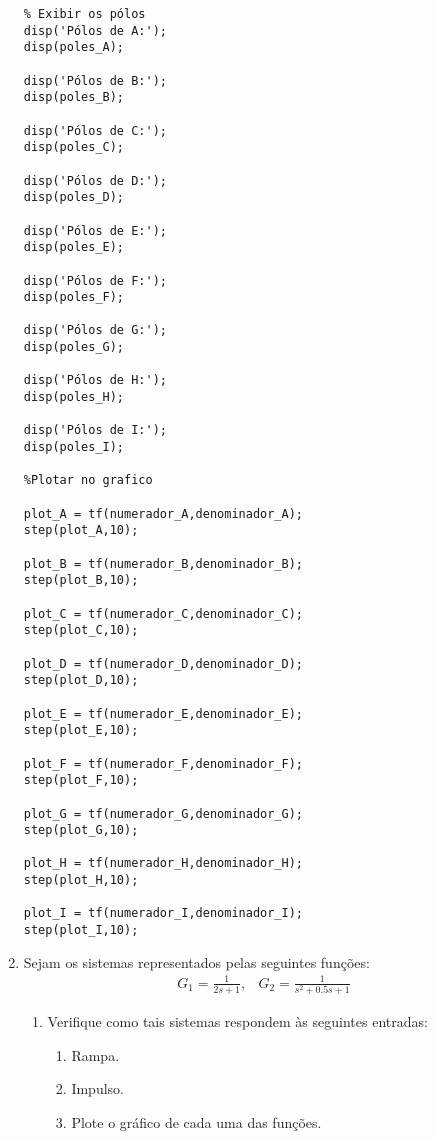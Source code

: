 \documentclass[a4paper,12pt]{article}
\begin{document}
\begin{enumerate}
\begin{lstlisting}
% Exibir os pólos
disp('Pólos de A:');
disp(poles_A);

disp('Pólos de B:');
disp(poles_B);

disp('Pólos de C:');
disp(poles_C);

disp('Pólos de D:');
disp(poles_D);

disp('Pólos de E:');
disp(poles_E);

disp('Pólos de F:');
disp(poles_F);

disp('Pólos de G:');
disp(poles_G);

disp('Pólos de H:');
disp(poles_H);

disp('Pólos de I:');
disp(poles_I);

%Plotar no grafico

plot_A = tf(numerador_A,denominador_A);
step(plot_A,10);

plot_B = tf(numerador_B,denominador_B);
step(plot_B,10);

plot_C = tf(numerador_C,denominador_C);
step(plot_C,10);

plot_D = tf(numerador_D,denominador_D);
step(plot_D,10);

plot_E = tf(numerador_E,denominador_E);
step(plot_E,10);

plot_F = tf(numerador_F,denominador_F);
step(plot_F,10);

plot_G = tf(numerador_G,denominador_G);
step(plot_G,10);

plot_H = tf(numerador_H,denominador_H);
step(plot_H,10);

plot_I = tf(numerador_I,denominador_I);
step(plot_I,10);
        \end{lstlisting}


        \item Sejam os sistemas representados pelas seguintes funções:
        \[
            \begin{array}{cc}
                G_1 = \frac{1}{2s + 1}, & G_2 = \frac{1}{s^2 + 0.5s + 1}
            \end{array}
        \]
        \begin{enumerate}
            \item Verifique como tais sistemas respondem às seguintes entradas:
            \begin{enumerate}
                \item Rampa.
                \item Impulso.
                \item Plote o gráfico de cada uma das funções.
            \end{enumerate}
        \end{enumerate}



\end{enumerate}
\end{document}
